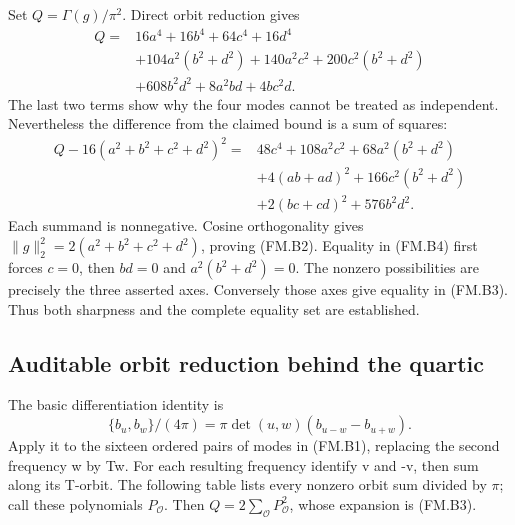 Set \(Q=\Gamma(g)/\pi^2\). Direct orbit reduction gives \[
\begin{split}
 Q={}&16a^4+16b^4+64c^4+16d^4\\
 &+104a^2(b^2+d^2)+140a^2c^2+200c^2(b^2+d^2)\\
 &+608b^2d^2+8a^2bd+4bc^2d.
\end{split}                                               \tag{FM.B3}
\] The last two terms show why the four modes cannot be treated as independent. Nevertheless the difference from the claimed bound is a sum of squares: \[
\begin{split}
 Q-16(a^2+b^2+c^2+d^2)^2
 ={}&48c^4+108a^2c^2+68a^2(b^2+d^2)\\
 &+4(ab+ad)^2+166c^2(b^2+d^2)\\
 &+2(bc+cd)^2+576b^2d^2.
\end{split}                                               \tag{FM.B4}
\] Each summand is nonnegative. Cosine orthogonality gives \(\|g\|_2^2=2(a^2+b^2+c^2+d^2)\), proving (FM.B2). Equality in (FM.B4) first forces \(c=0\), then \(bd=0\) and \(a^2(b^2+d^2)=0\). The nonzero possibilities are precisely the three asserted axes. Conversely those axes give equality in (FM.B3). Thus both sharpness and the complete equality set are established.

\subsection{Auditable orbit reduction behind the quartic}\label{four_mode:auditable-orbit-reduction-behind-the-quartic}

The basic differentiation identity is \[
 \{b_u,b_w\}/(4\pi)=\pi\det(u,w)(b_{u-w}-b_{u+w}).
\] Apply it to the sixteen ordered pairs of modes in (FM.B1), replacing the second frequency w by Tw. For each resulting frequency identify v and -v, then sum along its T-orbit. The following table lists every nonzero orbit sum divided by \(\pi\); call these polynomials \(P_{\mathcal O}\). Then \(Q=2\sum_{\mathcal O}P_{\mathcal O}^2\), whose expansion is (FM.B3).

